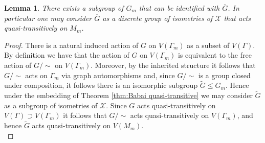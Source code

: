 \documentclass{article}
\numberwithin{equation}{section}
\newtheorem{lemma}{Lemma}[section]
\theoremstyle{definition}
\theoremstyle{remark}
\begin{document}
\begin{lemma}\label{lem:G_bar_acts_quasi-transitive_Gamma_m}
    There exists a subgroup of $G_m$ that can be identified with $\overline{G}$. In particular one may consider $\overline{G}$ as a discrete group of isometries of $\mathcal{X}$ that acts quasi-transitively on $M_m$.
\end{lemma}
\begin{proof}
There is a natural induced action of $G$ on $V(\Gamma_m)$ as a subset of $V(\Gamma)$. By definition we have that the action of $G$ on $V(\Gamma_m)$ is equivalent to the free action of $G/\sim$ on $V(\Gamma_m)$.
Moreover, by the inherited structure it follows that $G/\sim$ acts on $\Gamma_m$ via graph automorphisms and, since $G/\sim$ is a group closed under composition, it follows there is an isomorphic subgroup $\widetilde{G}\leq G_m$. Hence under the embedding of Theorem \ref{thm:Babai quasi-transitive} we may consider $\widetilde{G}$ as a subgroup of isometries of $\mathcal{X}$.
Since $G$ acts quasi-transitively on $V(\Gamma)\supset V(\Gamma_m)$ it follows that $G/\sim$ acts quasi-transitively on $V(\Gamma_m)$, and hence $\widetilde{G}$ acts quasi-transitively on $V(M_m)$.
\\
\end{proof}
\end{document}
